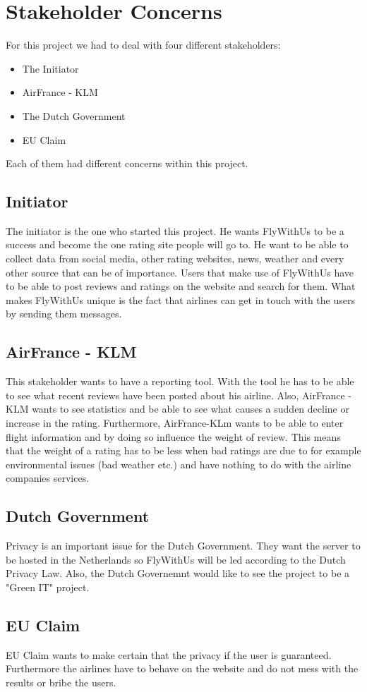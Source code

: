 \section{Stakeholder Concerns}

For this project we had to deal with four different stakeholders:
\begin{itemize}
\item The Initiator
\item AirFrance - KLM
\item The Dutch Government
\item EU Claim
\end{itemize}

Each of them had different concerns within this project.

\subsection{Initiator}
The initiator is the one who started this project. He wants FlyWithUs to be a success and become the one rating site people will go to. He want to be able to collect data from social media, other rating websites, news, weather and every other source that can be of importance. Users that make use of FlyWithUs have to be able to post reviews and ratings on the website and search for them. What makes FlyWithUs unique is the fact that airlines can get in touch with the users by sending them messages.

\subsection{AirFrance - KLM}
This stakeholder wants to have a reporting tool. With the tool he has to be able to see what recent reviews have been posted about his airline. Also, AirFrance - KLM wants to see statistics and be able to see what causes a sudden decline or increase in the rating. Furthermore, AirFrance-KLm wants to be able to enter flight information and by doing so influence the weight of review. This means that the weight of a rating has to be less when bad ratings are due to for example environmental issues (bad weather etc.) and have nothing to do with the airline companies services.

\subsection{Dutch Government}
Privacy is an important issue for the Dutch Government. They want the server to be hosted in the Netherlands so FlyWithUs will be led according to the Dutch Privacy Law. Also, the Dutch Governemnt would like to see the project to be a "Green IT" project. 

\subsection{EU Claim}
EU Claim wants to make certain that the privacy if the user is guaranteed. Furthermore the airlines have to behave on the website and do not mess with the results or bribe the users.  